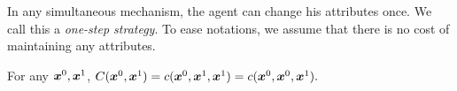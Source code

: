 \begin{remark}
    In any simultaneous mechanism, the agent can change his attributes once.
We call this a  \emph{one-step strategy}.
To ease notations, we assume that there is no cost of maintaining any attributes.

\begin{assumption}\label{assump: cost function one step}
	For any $\boldsymbol{x}^0,\boldsymbol{x}^1$, $C(\boldsymbol{x}^0,\boldsymbol{x}^1)=c(\boldsymbol{x}^0,\boldsymbol{x}^1,\boldsymbol{x}^1)=c(\boldsymbol{x}^0,\boldsymbol{x}^0,\boldsymbol{x}^1).$
 
\end{assumption}

\end{remark}





